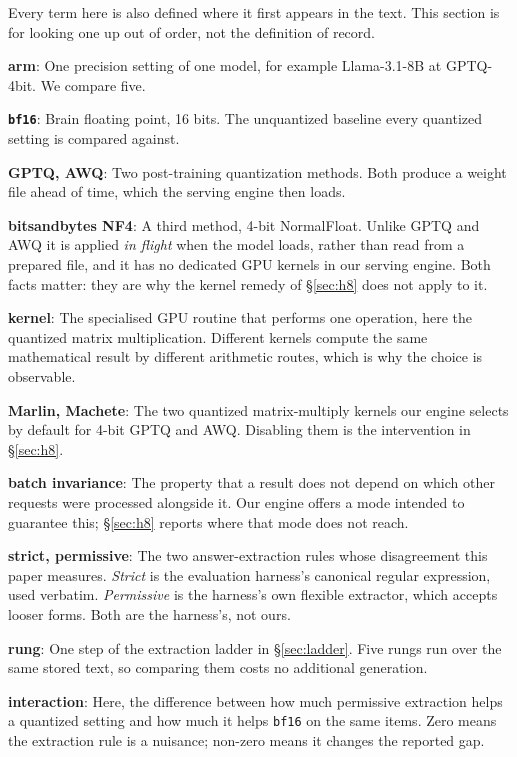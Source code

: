 \documentclass[conference]{IEEEtran}
\begin{document}
Every term here is also defined where it first appears in the text. This section is for
looking one up out of order, not the definition of record.

\noindent\textbf{arm}: One precision setting of one model, for example Llama-3.1-8B at GPTQ-4bit. We compare five.\par
\smallskip
\noindent\textbf{\texttt{bf16}}: Brain floating point, 16 bits. The unquantized baseline every quantized setting is compared against.\par
\smallskip
\noindent\textbf{GPTQ, AWQ}: Two post-training quantization methods. Both produce a weight file ahead of time, which the serving engine then loads.\par
\smallskip
\noindent\textbf{bitsandbytes NF4}: A third method, 4-bit NormalFloat. Unlike GPTQ and AWQ it is applied \emph{in flight} when the model loads, rather than read from a prepared file, and it has no dedicated GPU kernels in our serving engine. Both facts matter: they are why the kernel remedy of \S\ref{sec:h8} does not apply to it.\par
\smallskip
\noindent\textbf{kernel}: The specialised GPU routine that performs one operation, here the quantized matrix multiplication. Different kernels compute the same mathematical result by different arithmetic routes, which is why the choice is observable.\par
\smallskip
\noindent\textbf{Marlin, Machete}: The two quantized matrix-multiply kernels our engine selects by default for 4-bit GPTQ and AWQ. Disabling them is the intervention in \S\ref{sec:h8}.\par
\smallskip
\noindent\textbf{batch invariance}: The property that a result does not depend on which other requests were processed alongside it. Our engine offers a mode intended to guarantee this; \S\ref{sec:h8} reports where that mode does not reach.\par
\smallskip
\noindent\textbf{strict, permissive}: The two answer-extraction rules whose disagreement this paper measures. \emph{Strict} is the evaluation harness's canonical regular expression, used verbatim. \emph{Permissive} is the harness's own flexible extractor, which accepts looser forms. Both are the harness's, not ours.\par
\smallskip
\noindent\textbf{rung}: One step of the extraction ladder in \S\ref{sec:ladder}. Five rungs run over the same stored text, so comparing them costs no additional generation.\par
\smallskip
\noindent\textbf{interaction}: Here, the difference between how much permissive extraction helps a quantized setting and how much it helps \texttt{bf16} on the same items. Zero means the extraction rule is a nuisance; non-zero means it changes the reported gap.\par
\end{document}
